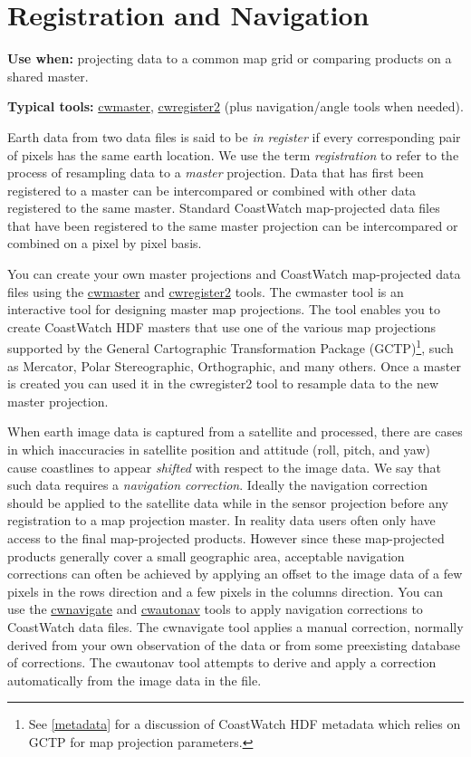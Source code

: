 \section{Registration and Navigation}
\label{registration}

\noindent\textbf{Use when:} projecting data to a common map grid or comparing products on a shared master.\par
\noindent\textbf{Typical tools:} \hyperlink{cwmaster}{cwmaster}, \hyperlink{cwregister2}{cwregister2} (plus navigation/angle tools when needed).\par

Earth data from two data files is said to be {\em in register} if
every corresponding pair of pixels has the same earth location.  We
use the term {\em registration} to refer to the process of resampling
data to a {\em master} projection.  Data that has first been
registered to a master can be intercompared or combined with
other data registered to the same master.  Standard CoastWatch
map-projected data files that have been registered to the same master
projection can be intercompared or combined on a pixel by pixel basis.

You can create your own master projections and CoastWatch map-projected
data files using the \hyperlink{cwmaster}{cwmaster} and
\hyperlink{cwregister2}{cwregister2} tools.  The cwmaster tool is an
interactive tool for designing master map projections.  The tool
enables you to create CoastWatch HDF masters that use one of the
various map projections supported by the General Cartographic
Transformation Package (GCTP)\footnote{See \autoref{metadata} for
a discussion of CoastWatch HDF metadata which relies on GCTP for
map projection parameters.}, such as Mercator, Polar Stereographic,
Orthographic, and many others.  Once a master is created 
you can used it in the cwregister2 tool to resample data to the new
master projection.

When earth image data is captured from a satellite and processed,
there are cases in which inaccuracies in satellite position and
attitude (roll, pitch, and yaw) cause coastlines to appear {\em
shifted} with respect to the image data.  We say that such data
requires a {\em navigation correction}.  Ideally the navigation
correction should be applied to the satellite data while in the
sensor projection before any registration to a map projection master.
In reality data users often only have access to the final map-projected
products.  However since these map-projected products generally
cover a small geographic area, acceptable navigation corrections
can often be achieved by applying an offset to the image data of a
few pixels in the rows direction and a few pixels in the columns
direction.  You can use the \hyperlink{cwnavigate}{cwnavigate} and
\hyperlink{cwautonav}{cwautonav} tools to apply navigation corrections
to CoastWatch data files.  The cwnavigate tool applies a manual
correction, normally derived from your own observation of the data
or from some preexisting database of corrections.  The cwautonav
tool attempts to derive and apply a correction automatically from
the image data in the file.

